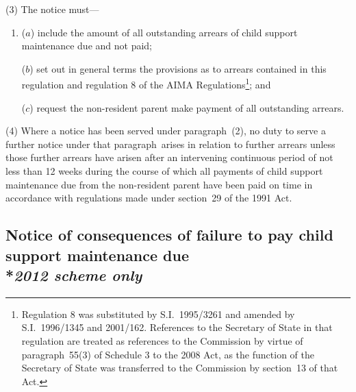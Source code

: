 \documentclass[12pt,a4paper]{article}
\begin{document}
(3) The notice must—
\begin{enumerate}\item[]

($a$) include the amount of all outstanding arrears of child support maintenance due and not paid;

($b$) set out in general terms the provisions as to arrears contained in this regulation and regulation 8 of the AIMA Regulations\footnote{Regulation 8 was substituted by S.I.~1995/3261 and amended by S.I.~1996/1345 and 2001/162. References to the Secretary of State in that regulation are treated as references to the Commission by virtue of paragraph~55(3) of Schedule 3 to the 2008 Act, as the function of the Secretary of State was transferred to the Commission by section~13 of that Act.}; and

($c$) request the non-resident parent make payment of all outstanding arrears.
\end{enumerate}

(4) Where a notice has been served under paragraph~(2), no duty to serve a further notice under that paragraph~arises in relation to further arrears unless those further arrears have arisen after an intervening continuous period of not less than 12 weeks during the course of which all payments of child support maintenance due from the non-resident parent have been paid on time in accordance with regulations made under section~29 of the 1991 Act.


\subsection[3A. Notice of consequences of failure to pay child support maintenance due]{Notice of consequences of failure to pay child support maintenance due\\*\emph{2012 scheme only}}
\end{document}
